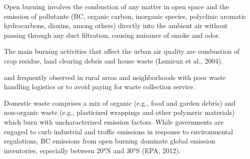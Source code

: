 Open burning involves the combustion
of any matter in open space and the emission of pollutants
(BC, organic carbon, inorganic species, polyclinic aromatic
hydrocarbons, dioxins, among others) directly into the
ambient air without passing through any duct filtration,
causing nuisance of smoke and odor.

The main burning activities that affect the urban air
quality are combustion of crop residue, land clearing debris
and house waste (Lemieux et al., 2004).

and frequently observed in rural areas and
neighborhoods with poor waste handling logistics or to
avoid paying for waste collection service.

Domestic waste
comprises a mix of organic (e.g., food and garden debris)
and non-organic waste (e.g., plasticized wrappings and
other polymeric materials) which burn with uncharacterized
emission factors. While governments are engaged to curb
industrial and traffic emissions in response to environmental
regulations, BC emissions from open burning dominate
global emission inventories, especially between 20°N and
30°S (EPA, 2012).



